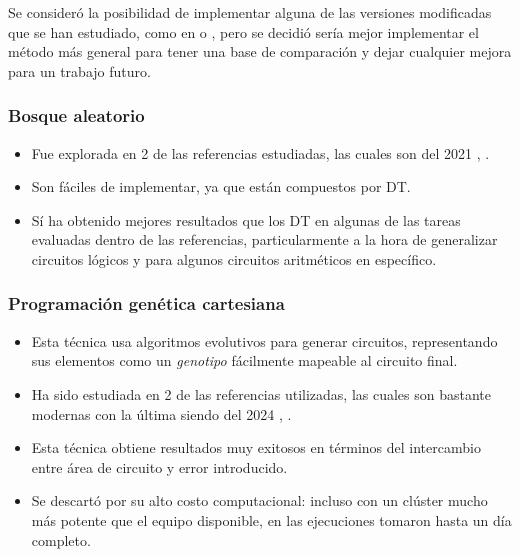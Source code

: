 Se consideró la posibilidad de implementar alguna de las versiones modificadas
que se han estudiado, como en \cite{hu_optdtals_2024} o
\cite{zeng_sampling-based_2021}, pero se decidió sería mejor implementar el
método más general para tener una base de comparación y dejar cualquier mejora
para un trabajo futuro.

\subsubsection{Bosque aleatorio}

\begin{itemize}
    \item Fue explorada en 2 de las referencias estudiadas, las cuales son del
      2021 \cite{miyasaka_logic_2021}, \cite{rai_logic_2021}.
    \item Son fáciles de implementar, ya que están compuestos por DT.
    \item Sí ha obtenido mejores resultados que los DT en algunas de las tareas
      evaluadas dentro de las referencias, particularmente a la hora de
      generalizar circuitos lógicos y para algunos circuitos aritméticos en
      específico.
\end{itemize}

\subsubsection{Programación genética cartesiana}

\begin{itemize}
    \item Esta técnica usa algoritmos evolutivos para generar circuitos,
      representando sus elementos como un \emph{genotipo} fácilmente mapeable
      al circuito final.
    \item Ha sido estudiada en 2 de las referencias utilizadas, las cuales son
      bastante modernas con la última siendo del 2024
      \cite{berndt_cgp-based_2022}, \cite{prats_ramos_impact_2024}.
    \item Esta técnica obtiene resultados muy exitosos en términos del
      intercambio entre área de circuito y error introducido.
    \item Se descartó por su alto costo computacional: incluso con un clúster
      mucho más potente que el equipo disponible, en
      \cite{berndt_cgp-based_2022} las ejecuciones tomaron hasta un día
      completo.
\end{itemize}

